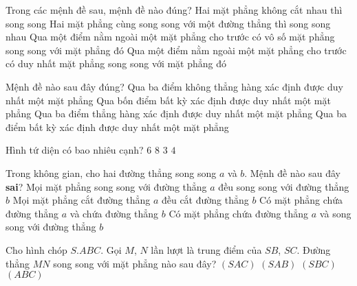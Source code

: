 \begin{ex}%
Trong các mệnh đề sau, mệnh đề nào đúng?
\choice
{Hai mặt phẳng không cắt nhau thì song song}
{Hai mặt phẳng cùng song song với một đường thẳng thì song song nhau}
{Qua một điểm nằm ngoài một mặt phẳng cho trước có vô số mặt phẳng song song với mặt phẳng đó}
{\True Qua một điểm nằm ngoài một mặt phẳng cho trước có duy nhất mặt phẳng song song với mặt phẳng đó}
\end{ex}

\begin{ex}%
Mệnh đề nào sau đây đúng?
\choice
{\True Qua ba điểm không thẳng hàng xác định được duy nhất một mặt phẳng}
{Qua bốn điểm bất kỳ xác định được duy nhất một mặt phẳng}
{Qua ba điểm thẳng hàng xác định được duy nhất một mặt phẳng}
{Qua ba điểm bất kỳ xác định được duy nhất một mặt phẳng}
\end{ex}

\begin{ex}%
Hình tứ diện có bao nhiêu cạnh?
\choice
{\True $6$}
{$8$}
{$3$}
{$4$}
\end{ex}

\begin{ex}%
Trong không gian, cho hai đường thẳng song song $a$ và $b$. Mệnh đề nào sau đây \textbf{sai}?
\choice
{\True Mọi mặt phẳng song song với đường thẳng $a$ đều song song với đường thẳng $b$}
{Mọi mặt phẳng cắt đường thẳng $a$ đều cắt đường thẳng $b$}
{Có mặt phẳng chứa đường thẳng $a$ và chứa đường thẳng $b$}
{Có mặt phẳng chứa đường thẳng $a$ và song song với đường thẳng $b$}
\end{ex}

\begin{ex}%
Cho hình chóp $S.ABC$. Gọi $M$, $N$ lần lượt là trung điểm của $SB$, $SC$. Đường thẳng $MN$ song song với mặt phẳng nào sau đây?
\choice
{$(SAC)$}
{$(SAB)$}
{$(SBC)$}
{\True $(ABC)$}
\end{ex}

